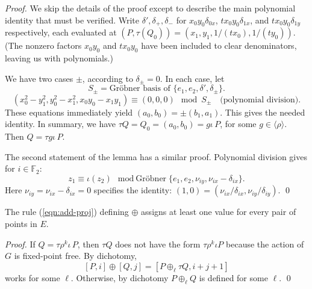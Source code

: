 \documentclass{llncs}
\newcommand{\ring}[1]{\mathbb{#1}}
\newcommand{\Eoo}{E^{\circ}} %
\newcommand{\Go}{\langle\rho\rangle}
\begin{document}
\begin{proof}  We skip the details of the proof except to describe
the main polynomial identity that must be verified.
Write $\delta',\delta_{+},\delta_{-}$ for $x_0 y_0\delta_{0x}$, $t x_0
y_0\delta_{1x}$, and $t x_0 y_0 \delta_{1y}$ respectively, each
evaluated at $(P,\tau(Q_0))=(x_1,y_1,1/(t x_0),1/(t y_0))$.  (The
nonzero factors $x_0y_0$ and $t x_0 y_0$ have been included to clear
denominators, leaving us with polynomials.)

We have two cases $\pm$, according to $\delta_{\pm}=0$.  In each case,
let
\[
S_\pm = \text{Gr\"obner basis of } \{e_1,e_2, 
\delta',\delta_{\pm} %
\}.
\]
\begin{equation}\label{eqn:dichot}
(x_0^2-y_1^2,y_0^2-x_1^2,x_0 y_0 - x_1 y_1) \equiv (0,0,0) \mod S_\pm\quad 
\text{(polynomial division)}.
\end{equation}
These equations immediately yield $(a_0,b_0) = \pm (b_1,a_1)$.  
This gives the needed identity.  In summary, we have $\tau Q =
Q_0 = (a_0,b_0) = g \iota\,P$, for some $g\in \Go$.  Then $Q = \tau g
\iota\,P$.

The second statement of the lemma has a similar proof.  Polynomial
division gives for $i\in \ring{F}_2$:
\[
z_1 \equiv \iota (z_2) \mod \text{Gr\"obner} 
\{ e_1,e_2,
\nu_{i y},\nu_{i x}-\delta_{i x} \}.
\]
Here $\nu_{i y}=\nu_{i x}-\delta_{i x}=0$ specifies
the identity:
$(1,0)=(\nu_{ix}/\delta_{ix},\nu_{iy}/\delta_{iy})$.
\qed\end{proof}

\begin{lemma}[covering] The rule (\ref{eqn:add-proj}) defining
  $\oplus$ assigns at least one value for every pair of points in $E$.
\end{lemma}

\begin{proof} If $Q=\tau \rho^k \iota\,P$, then $\tau Q$ does not have
  the form $\tau\rho^k\iota P$ because the action of $G$ is
  fixed-point free.  By dichotomy,
\begin{equation}\label{eqn:tt}
[P,i]\oplus [Q,j] = [P\oplus_\ell \tau Q,i+j+1]
\end{equation}
works for some $\ell$.  Otherwise, by dichotomy $P\oplus_\ell Q$ is
defined for some $\ell$.
\qed\end{proof}
\end{document}

